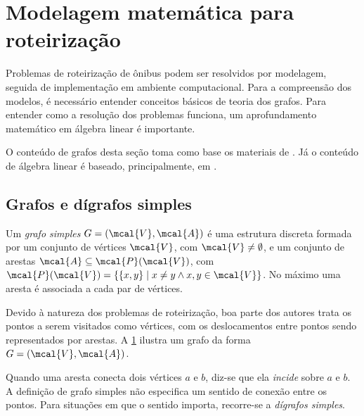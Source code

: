 \section{Modelagem matemática para roteirização}\label{sec:matemática}
Problemas de roteirização de ônibus podem ser resolvidos por modelagem, seguida de implementação em ambiente computacional. Para a compreensão dos modelos, é necessário entender conceitos básicos de teoria dos grafos. Para entender como a resolução dos problemas funciona, um aprofundamento matemático em álgebra linear é importante.

O conteúdo de grafos desta seção toma como base os materiais de \textcite{PRESTES:20,FEOFILOFF:11}. Já o conteúdo de álgebra linear é baseado, principalmente, em \textcite{BAZARAA:10,BERTSIMAS:97,FERRIS:07}.

\subsection{Grafos e dígrafos simples}
\begin{mydef}
    Um \emph{grafo simples} $G = (\mcal{V}, \mcal{A})$ é uma estrutura discreta formada por um conjunto de vértices $\mcal{V}$, com $\mcal{V} \neq \emptyset$, e um conjunto de arestas $\mcal{A} \subseteq \mcal{P}(\mcal{V})$, com $\mcal{P}(\mcal{V}) = \{\{x,y\}\mid x \neq y \land x,y \in \mcal{V}\}$. No máximo uma aresta é associada a cada par de vértices.
\end{mydef}

Devido à natureza dos problemas de roteirização, boa parte dos autores trata os pontos a serem visitados como vértices, com os deslocamentos entre pontos sendo representados por arestas. A \cref{fig:grafo simples} ilustra um grafo da forma $G = (\mcal{V}, \mcal{A})$.

\begin{figure}[h]
\centering
{}
\caption{}\label{fig:grafo simples}
\end{figure}

Quando uma aresta conecta dois vértices $a$ e $b$, diz-se que ela \emph{incide} sobre $a$ e $b$. A definição de grafo simples não especifica um sentido de conexão entre os pontos. Para situações em que o sentido importa, recorre-se a \emph{dígrafos simples}.

